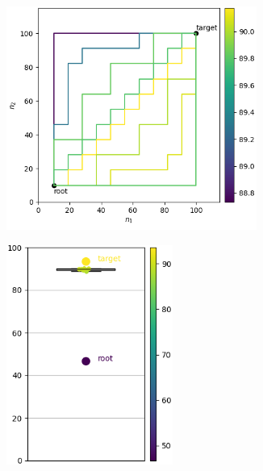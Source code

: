 \documentclass{article}
\begin{document}
\begin{figure}[htbp]
    \centering
    \begin{subfigure}[b]{0.29\textwidth}
        \centering
        \includegraphics[width=0.9\textwidth]{imgs/pathes_MNIST_random_2024_05_02_14_52_58.png}
    \end{subfigure}
    \begin{subfigure}[b]{0.29\textwidth}
        \centering
        \includegraphics[width=0.6\textwidth]{imgs/box_plot_MNIST_random_2024_05_02_14_52_58.png}
    \end{subfigure}
    

\end{figure}
\end{document}
